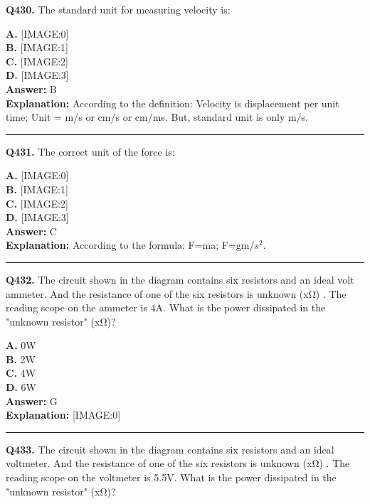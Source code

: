 \documentclass[12pt]{article}
\begin{document}
\noindent
\textbf{Q430.} The standard unit for measuring velocity is:



\textbf{A.} [IMAGE:0] \\
\textbf{B.} [IMAGE:1] \\
\textbf{C.} [IMAGE:2] \\
\textbf{D.} [IMAGE:3] \\

\textbf{Answer:} B \\
\textbf{Explanation:} According to the definition: Velocity is displacement per unit time; Unit = m/s or cm/s or cm/ms.
But, standard unit is only m/s.

\hrule
\vspace{1em}


\noindent
\textbf{Q431.} The correct unit of the force is:



\textbf{A.} [IMAGE:0] \\
\textbf{B.} [IMAGE:1] \\
\textbf{C.} [IMAGE:2] \\
\textbf{D.} [IMAGE:3] \\

\textbf{Answer:} C \\
\textbf{Explanation:} According to the formula: F=ma; F=gm/$s^2$.

\hrule
\vspace{1em}


\noindent
\textbf{Q432.} The circuit shown in the diagram contains six resistors and an ideal volt ammeter. And the resistance of one of the six resistors is unknown (xΩ) . The reading scope on the ammeter is 4A.
What is the power dissipated in the "unknown resistor" (xΩ)?



\textbf{A.} 0W \\
\textbf{B.} 2W \\
\textbf{C.} 4W \\
\textbf{D.} 6W \\

\textbf{Answer:} G \\
\textbf{Explanation:} [IMAGE:0]

\hrule
\vspace{1em}


\noindent
\textbf{Q433.} The circuit shown in the diagram contains six resistors and an ideal voltmeter. And the resistance of one of the six resistors is unknown (xΩ) . The reading scope on the voltmeter is 5.5V.
What is the power dissipated in the "unknown resistor" (xΩ)?
\end{document}
